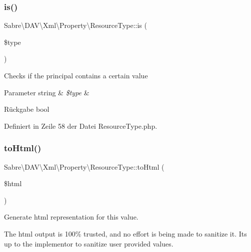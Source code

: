 \subsubsection{\texorpdfstring{is()}{is()}}
{\footnotesize\ttfamily Sabre\textbackslash{}\+D\+A\+V\textbackslash{}\+Xml\textbackslash{}\+Property\textbackslash{}\+Resource\+Type\+::is (\begin{DoxyParamCaption}\item[{}]{\$type }\end{DoxyParamCaption})}

Checks if the principal contains a certain value


\begin{DoxyParams}[1]{Parameter}
string & {\em \$type} & \\
\hline
\end{DoxyParams}
\begin{DoxyReturn}{Rückgabe}
bool 
\end{DoxyReturn}


Definiert in Zeile 58 der Datei Resource\+Type.\+php.

\mbox{\label{class_sabre_1_1_d_a_v_1_1_xml_1_1_property_1_1_resource_type_a05091dcffe3fd53144b2ba464b569cfc}} 
\subsubsection{\texorpdfstring{to\+Html()}{toHtml()}}
{\footnotesize\ttfamily Sabre\textbackslash{}\+D\+A\+V\textbackslash{}\+Xml\textbackslash{}\+Property\textbackslash{}\+Resource\+Type\+::to\+Html (\begin{DoxyParamCaption}\item[{\mbox{\hyperlink{class_sabre_1_1_d_a_v_1_1_browser_1_1_html_output_helper}{Html\+Output\+Helper}}}]{\$html }\end{DoxyParamCaption})}

Generate html representation for this value.

The html output is 100\% trusted, and no effort is being made to sanitize it. It\textquotesingle{}s up to the implementor to sanitize user provided values.


